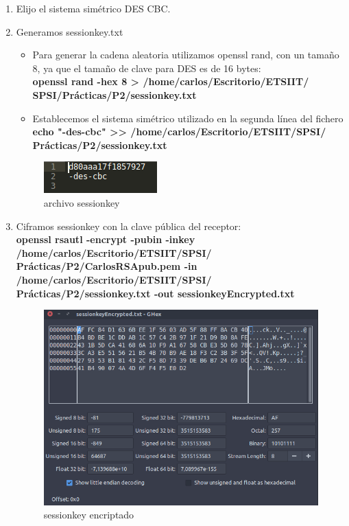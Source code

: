 \begin{enumerate}
	\item Elijo el sistema simétrico DES CBC.
	\item Generamos sessionkey.txt
		\begin{itemize}
			\item Para generar la cadena aleatoria utilizamos openssl rand, con un tamaño 8, ya que el tamaño de clave para DES es de 16 bytes:\\
			\textbf{openssl rand -hex 8 > /home/carlos/Escritorio/ETSIIT/\\SPSI/Prácticas/P2/sessionkey.txt}
			\item Establecemos el sistema simétrico utilizado en la segunda línea del fichero \\
			\textbf{echo "-des-cbc" >> /home/carlos/Escritorio/ETSIIT/SPSI/\\Prácticas/P2/sessionkey.txt}
		\end{itemize}
	
		\begin{figure}[H] %
			\centering
			\includegraphics[scale=1]{imagenes/sessionkey} 
			\caption{archivo sessionkey} \label{etiq}
		\end{figure}
	\item Ciframos sessionkey con la clave pública del receptor: \\
		\textbf{openssl rsautl -encrypt -pubin -inkey\\ /home/carlos/Escritorio/ETSIIT/SPSI/\\Prácticas/P2/CarlosRSApub.pem -in /home/carlos/Escritorio/ETSIIT/SPSI/\\Prácticas/P2/sessionkey.txt -out sessionkeyEncrypted.txt}
		
		\begin{figure}[H] %
			\centering
			\includegraphics[scale=0.55]{imagenes/sessionkeyEncrypted} 
			\caption{sessionkey encriptado} \label{etiq}
		\end{figure}
		

\end{enumerate}
